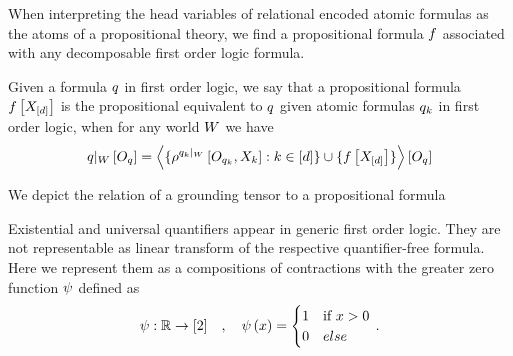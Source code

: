 
When interpreting the head variables of relational encoded atomic formulas as the atoms of a propositional theory, we find a propositional formula $f$ associated with any decomposable first order logic formula.

\begin{definition}\label{def:propositionalEquivalent}
	Given a formula $q$ in first order logic, we say that a propositional formula $f\left[X_{[d]}\right]$ is the propositional equivalent to $q$ given atomic formulas $q_{k}$ in first order logic, when for any world $W$ we have
	\begin{align}
		{q}|_{W} \left[O_{q}\right]
		= \left\langle  
		\{\rho^{{q_{k}}|_{W}}\left[O_{q_{k}}, X_{k}\right] : k\in[d]\} 
		\cup \{f\left[X_{[d]}\right] \}
		\right\rangle \left[ O_{q} \right]
	\end{align}
\end{definition}



We depict the relation of a grounding tensor to a propositional formula 
\begin{center}
	
\end{center}






Existential and universal quantifiers appear in generic first order logic.
They are not representable as linear transform of the respective quantifier-free formula.
Here we represent them as a compositions of contractions with the greater zero function $\psi$ defined as
\begin{align*}
	\psi : \mathbb{R} \rightarrow [2] \quad, \quad \psi\left(x\right) = 
	\begin{cases}
		1 &  \text{if  } x > 0\\
		0 & else
	\end{cases} \, .
\end{align*}


